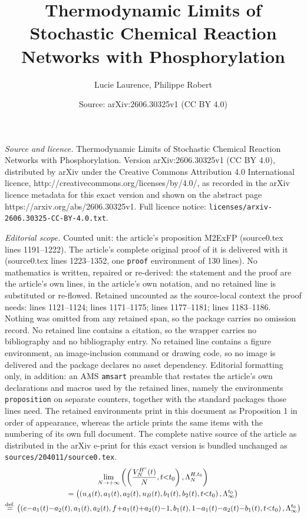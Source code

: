 \documentclass[10pt,a4paper]{amsart}
\title{Thermodynamic Limits of Stochastic Chemical Reaction Networks with Phosphorylation}
\author{Lucie Laurence, Philippe Robert}
\date{Source: arXiv:2606.30325v1 (CC BY 4.0)}
\newcommand\steq[1]{\stackrel{\text{\rm #1.}}{=}}
\begin{document}
\maketitle

\noindent\emph{Source and licence.} Thermodynamic Limits of Stochastic Chemical Reaction Networks with Phosphorylation. Version arXiv:2606.30325v1 (CC BY 4.0), distributed by arXiv under the Creative Commons Attribution 4.0 International licence, http://creativecommons.org/licenses/by/4.0/, as recorded in the arXiv licence metadata for this exact version and shown on the abstract page https://arxiv.org/abs/2606.30325v1. Full licence notice: \texttt{licenses/arxiv-2606.30325-CC-BY-4.0.txt}.\par\smallskip

\noindent\textit{Editorial scope.} Counted unit: the article's proposition M2ExFP (source0.tex lines 1191--1222). The article's complete original proof of it is delivered with it (source0.tex lines 1223--1352, one \texttt{proof} environment of 130 lines). No mathematics is written, repaired or re-derived: the statement and the proof are the article's own lines, in the article's own notation, and no retained line is substituted or re-flowed.  Retained uncounted as the source-local context the proof needs: lines 1121--1124; lines 1171--1175; lines 1177--1181; lines 1183--1186.  Nothing was omitted from any retained span, so the package carries no omission record.  No retained line contains a citation, so the wrapper carries no bibliography and no bibliography entry.  No retained line contains a figure environment, an image-inclusion command or drawing code, so no image is delivered and the package declares no asset dependency.  Editorial formatting only, in addition: an AMS \texttt{amsart} preamble that restates the article's own declarations and macros used by the retained lines, namely the environments \texttt{proposition} on separate counters, together with the standard packages those lines need.  The retained environments print in this document as Proposition 1 in order of appearance, whereas the article prints the same items with the numbering of its own full document.  The complete native source of the article as distributed in the arXiv e-print for this exact version is bundled unchanged as \texttt{sources/204011/source0.tex}.
\begin{multline}\label{VM2}
\lim_{N\to+\infty}\left(\left(\frac{V_N^{H^c}(t)}{N},t{<}t_0\right),\Lambda_N^{H,t_0}\right)\\=\left(\left({u}_A(t),{a}_1(t),{a}_2(t),{u}_B(t),{b}_1(t),{b}_2(t), t{<}t_0\right),\Lambda_\infty^{t_0}\right)\\
{\steq{def}\left(\left(e{-}{a}_1(t){-}{a}_2(t),{a}_1(t),{a}_2(t),f{+}{a}_1(t){+}{a}_2(t){-}1,{b}_1(t),1{-}{a}_1(t){-}{a}_2(t){-}{b}_1(t), t{<}t_0\right),\Lambda_\infty^{t_0}\right)}
\end{multline}
\end{document}
